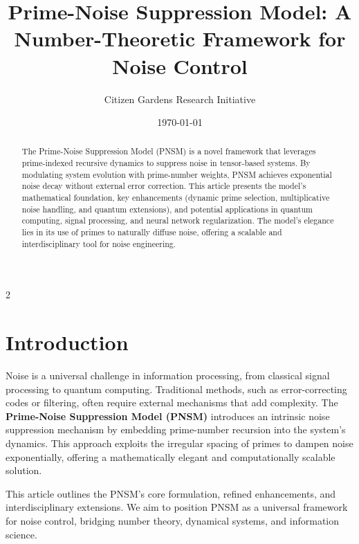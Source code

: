 \documentclass{article}
\theoremstyle{plain}
\begin{document}
\title{Prime-Noise Suppression Model: A Number-Theoretic Framework for Noise Control}
\author{Citizen Gardens Research Initiative}
\date{\today}


\maketitle

\begin{abstract}
The Prime-Noise Suppression Model (PNSM) is a novel framework that leverages prime-indexed recursive dynamics to suppress noise in tensor-based systems. By modulating system evolution with prime-number weights, PNSM achieves exponential noise decay without external error correction. This article presents the model’s mathematical foundation, key enhancements (dynamic prime selection, multiplicative noise handling, and quantum extensions), and potential applications in quantum computing, signal processing, and neural network regularization. The model’s elegance lies in its use of primes to naturally diffuse noise, offering a scalable and interdisciplinary tool for noise engineering.
\end{abstract}

\newpage
\begin{multicols}{2}
\begin{singlespace}
\tableofcontents
\end{singlespace}
\end{multicols}

\linenumbers
\section{Introduction}
Noise is a universal challenge in information processing, from classical signal processing to quantum computing. Traditional methods, such as error-correcting codes or filtering, often require external mechanisms that add complexity. The \textbf{Prime-Noise Suppression Model (PNSM)} introduces an intrinsic noise suppression mechanism by embedding prime-number recursion into the system’s dynamics. This approach exploits the irregular spacing of primes to dampen noise exponentially, offering a mathematically elegant and computationally scalable solution.

This article outlines the PNSM’s core formulation, refined enhancements, and interdisciplinary extensions. We aim to position PNSM as a universal framework for noise control, bridging number theory, dynamical systems, and information science.
\end{document}
